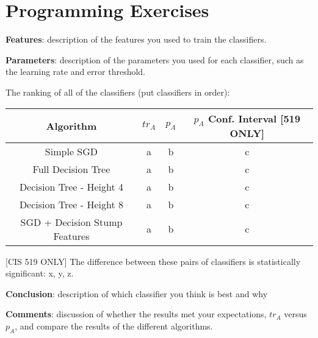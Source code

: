 \documentclass{article}
\begin{document}
        
        \section{Programming Exercises}
        \textbf{Features}: description of the features you used to train the classifiers.
        
        \noindent\textbf{Parameters}: description of the parameters you used for each classifier, such as the learning rate and error threshold.
        
        The ranking of all of the classifiers (put classifiers in order):
        \begin{center}
            \begin{tabular}{|c|c|c|c|}
                \hline
                Algorithm & $tr_A$ & $p_A$ & $p_A$ Conf. Interval [519 ONLY]\\
                \hline
                Simple SGD & a & b & c \\
                Full Decision Tree & a & b & c \\
                Decision Tree - Height 4 & a & b & c \\
                Decision Tree - Height 8 & a & b & c \\
                SGD + Decision Stump Features & a & b & c \\
                \hline
        \end{tabular}
                \end{center}
        
        [CIS 519 ONLY] The difference between these pairs of classifiers is statistically significant: x, y, z.
        
        \textbf{Conclusion}: description of which classifier you think is best and why
        
        \textbf{Comments}: discussion of whether the results met your expectations, $tr_A$ versus $p_A$, and compare the results of the different algorithms. 
        
\end{document}
